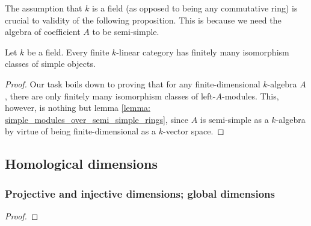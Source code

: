             \begin{remark}
                The assumption that $k$ is a field (as opposed to being any commutative ring) is crucial to validity of the following proposition. This is because we need the algebra of coefficient $A$ to be semi-simple. 
            \end{remark}
            \begin{proposition} \label{prop: simple_objects_in_finite_linear_categories}
                Let $k$ be a field. Every finite $k$-linear category has finitely many isomorphism classes of simple objects. 
            \end{proposition}
                \begin{proof}
                    Our task boils down to proving that for any finite-dimensional $k$-algebra $A$, there are only finitely many isomorphism classes of left-$A$-modules. This, however, is nothing but lemma \ref{lemma: simple_modules_over_semi_simple_rings}, since $A$ is semi-simple as a $k$-algebra by virtue of being finite-dimensional as a $k$-vector space. 
                \end{proof}
        
    \subsection{Homological dimensions}
        \subsubsection{Projective and injective dimensions; global dimensions}
            \begin{lemma} \label{lemma: schaunel_lemma}
                \cite[\href{https://stacks.math.columbia.edu/tag/00O3}{Tag 00O3}]{stacks}
            \end{lemma}
                \begin{proof}
                    
                \end{proof}
        
